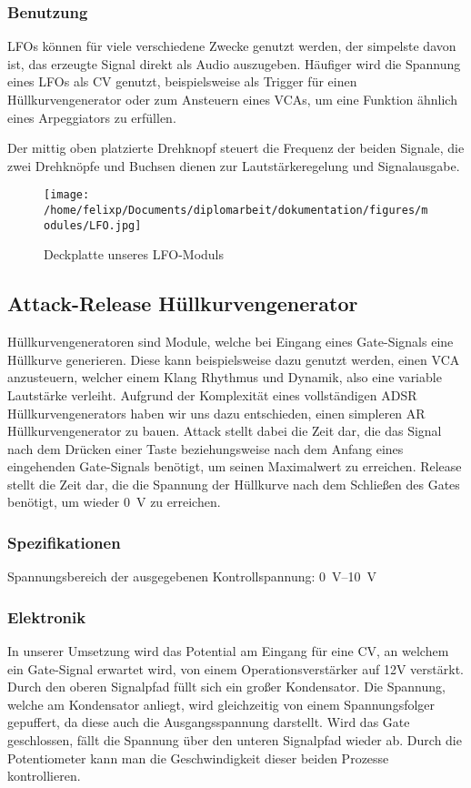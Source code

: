 \subsubsection{Benutzung}
\label{sec:org5f8496e}
\acp{LFO} können für viele verschiedene Zwecke genutzt werden, der simpelste davon ist, das erzeugte Signal direkt als Audio auszugeben. Häufiger wird die Spannung eines \ac{LFO}s als \acl{CV} genutzt, beispielsweise als Trigger für einen Hüllkurvengenerator oder zum Ansteuern eines \acp{VCA}, um eine Funktion ähnlich eines Arpeggiators zu erfüllen.

Der mittig oben platzierte Drehknopf steuert die Frequenz der beiden Signale, die zwei Drehknöpfe und Buchsen dienen zur Lautstärkeregelung und Signalausgabe.

\begin{figure}[hp]
\centering
\texttt{[image: /home/felixp/Documents/diplomarbeit/dokumentation/figures/modules/LFO.jpg]}
\caption{Deckplatte unseres LFO-Moduls}
\end{figure}

\cite{haillant:lfo}
\subsection{Attack-Release Hüllkurvengenerator \label{AR}}
\label{sec:orga27fd5f}
Hüllkurvengeneratoren sind Module, welche bei Eingang eines Gate-Signals eine Hüllkurve generieren. Diese kann beispielsweise dazu genutzt werden, einen \ac{VCA} anzusteuern, welcher einem Klang Rhythmus und Dynamik, also eine variable Lautstärke verleiht. Aufgrund der Komplexität eines vollständigen \ac{ADSR} Hüllkurvengenerators haben wir uns dazu entschieden, einen simpleren \ac{AR} Hüllkurvengenerator zu bauen. Attack stellt dabei die Zeit dar, die das Signal nach dem Drücken einer Taste beziehungsweise nach dem Anfang eines eingehenden Gate-Signals benötigt, um seinen Maximalwert zu erreichen. Release stellt die Zeit dar, die die Spannung der Hüllkurve nach dem Schließen des Gates benötigt, um wieder \SI{0}{\volt} zu erreichen.

\subsubsection{Spezifikationen}
\label{sec:orge4e13f8}
Spannungsbereich der ausgegebenen Kontrollspannung: \SIrange{0}{10}{\volt}

\subsubsection{Elektronik}
\label{sec:org620cc07}
In unserer Umsetzung wird das Potential am Eingang für eine \acl{CV}, an welchem ein Gate-Signal erwartet wird, von einem Operationsverstärker auf 12V verstärkt. Durch den oberen Signalpfad füllt sich ein großer Kondensator. Die Spannung, welche am Kondensator anliegt, wird gleichzeitig von einem Spannungsfolger gepuffert, da diese auch die Ausgangsspannung darstellt. Wird das Gate geschlossen, fällt die Spannung über den unteren Signalpfad wieder ab. Durch die Potentiometer kann man die Geschwindigkeit dieser beiden Prozesse kontrollieren.

